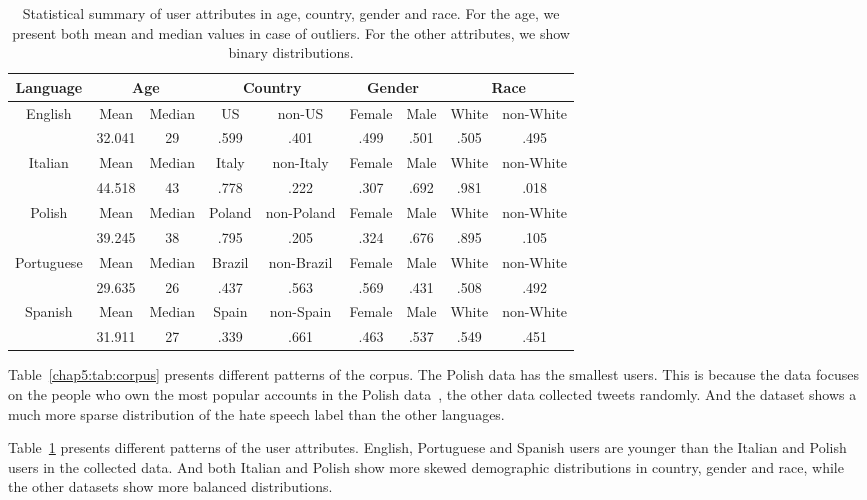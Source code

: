 \begin{table}[htp]
\centering
\begin{tabular}{c||cc|cc|cc|cc}
Language & \multicolumn{2}{c|}{Age} & \multicolumn{2}{c|}{Country} & \multicolumn{2}{c|}{Gender} & \multicolumn{2}{c}{Race} \\\hline\hline
\multirow{2}{*}{English} & Mean & Median & US & non-US & Female & Male & White & non-White \\
 & 32.041 & 29 & .599 & .401 & .499 & .501 & .505 & .495 \\\hline
\multirow{2}{*}{Italian} & Mean & Median & Italy & non-Italy & Female & Male & White & non-White \\
 & 44.518 & 43 & .778 & .222 & .307 & .692 & .981 & .018 \\\hline
\multirow{2}{*}{Polish} & Mean & Median & Poland & non-Poland & Female & Male & White & non-White \\
 & 39.245 & 38 & .795 & .205 & .324 & .676 & .895 & .105 \\\hline
\multirow{2}{*}{Portuguese} & Mean & Median & Brazil & non-Brazil & Female & Male & White & non-White \\
 & 29.635 & 26 & .437 & .563 & .569 & .431 & .508 & .492 \\\hline
\multirow{2}{*}{Spanish} & Mean & Median & Spain & non-Spain & Female & Male & White & non-White \\
 & 31.911 & 27 & .339 & .661 & .463 & .537 & .549 & .451
\end{tabular}
\caption{Statistical summary of user attributes in age, country, gender and race. For the age, we present both mean and median values in case of outliers. For the other attributes, we show binary distributions.}
\label{chap5:tab:user}
\end{table}

Table~\ref{chap5:tab:corpus} presents different patterns of the corpus. 
The Polish data has the smallest users. 
This is because the data focuses on the people who own the most popular accounts in the Polish data~\cite{ptaszynski2017learning}, the other data collected tweets randomly.
And the dataset shows a much more sparse distribution of the hate speech label than the other languages.

Table~\ref{chap5:tab:user} presents different patterns of the user attributes. 
English, Portuguese and Spanish users are younger than the Italian and Polish users in the collected data.
And both Italian and Polish show more skewed demographic distributions in country, gender and race, while the other datasets show more balanced distributions.


